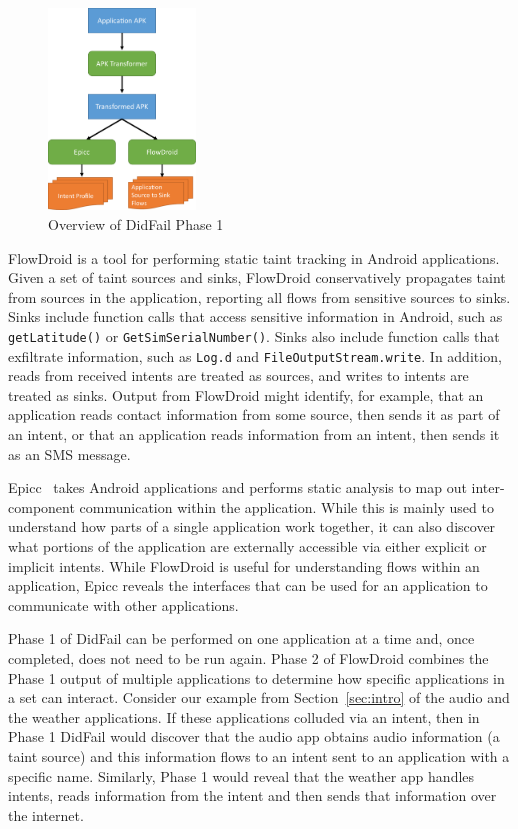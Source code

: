 \begin{figure}[h]
	\centering
	\includegraphics[width=0.35\textwidth]{didfail1.pdf}
	\caption{Overview of DidFail Phase 1}
	\label{fig:overview_phase1}
\end{figure}

FlowDroid is a tool for performing static taint tracking in Android applications. Given a set of taint sources and sinks, FlowDroid conservatively propagates taint from sources in the application, reporting all flows from sensitive sources to sinks. Sinks include function calls that access sensitive information in Android, such as \texttt{getLatitude()} or \texttt{GetSimSerialNumber()}. Sinks also include function calls that exfiltrate information, such as \texttt{Log.d} and \texttt{FileOutputStream.write}. In addition, reads from received intents are treated as sources, and writes to intents are treated as sinks. Output from FlowDroid might identify, for example, that an application reads contact information from some source, then sends it as part of an intent, or that an application reads information from an intent, then sends it as an SMS message.

Epicc~\cite{epicc} takes Android applications and performs static analysis to map out inter-component communication within the application. While this is mainly used to understand how parts of a single application work together, it can also discover what portions of the application are externally accessible via either explicit or implicit intents. While FlowDroid is useful for understanding flows within an application, Epicc reveals the interfaces that can be used for an application to communicate with other applications.

Phase 1 of DidFail can be performed on one application at a time and, once completed, does not need to be run again. Phase 2 of FlowDroid combines the Phase 1 output of multiple applications to determine how specific applications in a set can interact. Consider our example from Section~\ref{sec:intro} of the audio and the weather applications. If these applications colluded via an intent, then in Phase 1 DidFail would discover that the audio app obtains audio information (a taint source) and this information flows to an intent sent to an application with a specific name. Similarly, Phase 1 would reveal that the weather app handles intents, reads information from the intent and then sends that information over the internet. 


